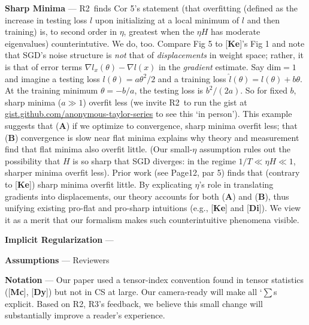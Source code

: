 \documentclass{article}
\newcommand{\Rb}{\textmd{\textsf{\color{green!50}  {R2}}}}
\newcommand{\Rc}{\textmd{\textsf{\color{blue!50}   {R3}}}}
\newcommand{\cor}[1]{\textmd{\textsf{Cor #1}}}
\newcommand{\pag}[1]{\textmd{\textsf{Page#1}}}
\newcommand{\fig}[1]{\textmd{\textsf{Fig #1}}}
\newcommand{\cit}[1]{[\textbf{#1}]}
\newcommand{\moosect}[1]{\par\noindent\textbf{#1} ---}
\newcommand{\offive}[1]{
    {\tiny
        \raisebox{-0.04cm}{\color{gray}\scalebox{2.5}{$\substack{
            \ifthenelse{\equal{#1}{0}}{{\color{moor}\blacksquare}}{\square} 
        }$}}%
        \raisebox{0.04cm}{$\substack{
            \IfSubStr{#1}{1}{{\color{moor}\blacksquare}}{\square}   
            \IfSubStr{#1}{1}{{\color{moor}\blacksquare}}{\square} \\
            \IfSubStr{#1}{2}{{\color{moor}\blacksquare}}{\square}    
            \IfSubStr{#1}{2}{{\color{moor}\blacksquare}}{\square}    
        }$}%
    }%
}
\begin{document}
\moosect{Sharp Minima}
    \Rb\ finds \cor{5}'s statement ({\small that overfitting
    (defined as the increase in testing loss $l$ upon initializing at a local
    minimum of $l$ and then training) is, to second order in $\eta$, greatest
    when the $\eta H$ has moderate eigenvalues}) 
    counterintutive.  We do, too.
    Compare \fig{5\offive{1}} to \cit{Ke}'s \fig{1} and note that SGD's noise
    structure is \emph{not} that of \emph{displacements} in weight space;
    rather, it is that of error terms $\nabla l_x(\theta)-\nabla l(x)$ in the
    \emph{gradient} estimate.  
    Say $\text{dim}=1$ and imagine a testing loss
    $l(\theta)=a \theta^2/2$ and a training loss $\hat
    l(\theta)=l(\theta)+b\theta$.  At the training minimum $\theta=-b/a$, the
    testing loss is $b^2/(2a)$.  So for fixed $b$, sharp minima ($a\gg 1$)
    overfit less (we invite \Rb\ to run the gist at
    \href{https://gist.github.com/anonymous-taylor-series/60ee7ca824e44a9e8f25e69ceb60995e}{gist.github.com/anonymous-taylor-series} to 
    see this `in person').
    This example suggests that (\textbf{A}) if we optimize to
    convergence, sharp minima overfit less; that (\textbf{B}) convergence is slow near
    flat minima explains why theory and measurement find that flat minima also
    overfit little.  (Our small-$\eta$ assumption rules out the possibility
    that $H$ is so sharp that SGD diverges: in the regime $1/T \ll \eta H \ll
    1$, sharper minima overfit less).
    Prior work (see \pag{12, par 5}) finds that (contrary to \cit{Ke}) sharp
    minima overfit little.  By explicating $\eta$'s role in translating
    gradients into displacements, our theory accounts for both (\textbf{A}) and
    (\textbf{B}), thus unifying existing pro-flat and pro-sharp intuitions
    (e.g., \cit{Ke} and \cit{Di}).
    We view it as a merit that our formalism makes such counterintuitive
    phenomena visible.
    
\moosect{Implicit Regularization}
    
\moosect{Assumptions} Reviewers  

\moosect{Notation}
    Our paper used a tensor-index convention found in tensor statistics
    (\cit{Mc}, \cit{Dy}) but not in CS at large.  Our camera-ready will make
    all `$\sum$s explicit.  Based on \Rb,\Rc's feedback, we believe this small
    change will substantially improve a reader's experience.
\end{document}
